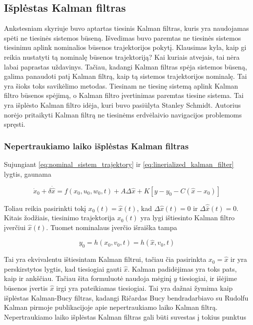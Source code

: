 \subsection{Išplėstas Kalman filtras}

    Ankstesniam skyriuje buvo aptartas tiesinis Kalman filtras, kuris yra naudojamas spėti ne tiesinės sistemos būseną.
    Išvedimas buvo paremtas ne tiesinės sistemos tiesinimu aplink nominalios būsenos trajektorijos pokytį.
    Klausimas kyla, kaip gi reikia nustatyti tą nominalę būsenos trajektoriją?
    Kai kuriais atvejais, tai nėra labai paprastas uždavinys.
    Tačiau, kadangi Kalman filtras spėja sistemos būseną, galima panaudoti patį Kalman filtrą, kaip tą sistemos trajektorijos nominalę.
    Tai yra šioks toks savikėlimo metodas.
    Tiesinam ne tiesinę sistemą aplink Kalman filtro būsenos spėjimą, o Kalman filtro įvertinimas paremtas tiesine sistema.
    Tai yra išplėsto Kalman filtro idėja, kuri buvo pasiūlyta Stanley Schmidt.
    Autorius norėjo pritaikyti Kalman filtrą ne tiesinėms erdvėlaivio navigacijos problemoms spręsti.

\subsubsection{Nepertraukiamo laiko išplėstas Kalman filtras}

        Sujungiant \ref{eq:nominal_sistem_trajektory} ir \ref{eq:linerialized_kalman_filter} lygtis, gaunama

        \begin{equation}
            \dot{x}_0 + \delta \dot{\hat{x}} = f(x_0, u_0, w_0, t) + A \Delta \hat{x} + K[y-y_0 -C(\hat{x} - x_0)]
        \end{equation}

        Toliau reikia pasirinkti tokį $x_0(t)=\hat{x}(t)$, kad $\Delta\hat{x}(t) = 0$ ir $\Delta\hat{\bar{x}}(t) = 0$.
        Kitais žodžiais, tiesinimo trajektorija $x_0(t)$ yra lygi ištiesinto Kalman filtro įverčiui $\hat{x}(t)$.
        Tuomet nominalaus įverčio išraiška tampa

        \begin{equation}
            y_0 = h(x_0, v_0, t) = h(\hat{x}, v_0, t)
        \end{equation}

        Tai yra ekvivalentu ištiesintam Kalman filtrui, tačiau čia pasirinkta $x_0 = \hat{x}$ ir yra perskirstytos lygtis, kad tiesiogiai gauti $\hat{x}$.
        Kalman padidėjimas yra toks pats, kaip ir ankščiau.
        Tačiau šita formuluotė naudoja mėginį $y$ tiesiogiai, ir išėjime būsenos įvertis $\hat{x}$ irgi yra pateikiamas tiesiogiai.
        Tai yra dažnai žymima kaip išplėstas Kalman-Bucy filtras, kadangi Ričardas Bucy bendradarbiavo su Rudolfu Kalman pirmoje publikacijoje apie nepertraukiamo laiko Kalman filtrą.
        Nepertraukiamo laiko išplėstas Kalman filtras gali būti suvestas į tokius punktus

